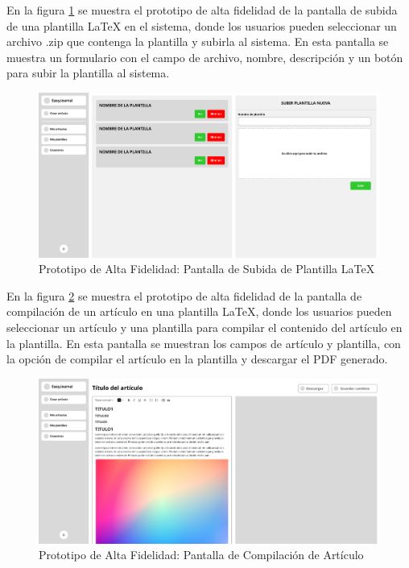 


En la figura \ref{fig:prototipo-subir-plantilla} se muestra el prototipo de alta fidelidad de la pantalla de subida de una plantilla LaTeX en el sistema, donde los usuarios pueden seleccionar un archivo .zip que contenga la plantilla y subirla al sistema. En esta pantalla se muestra un formulario con el campo de archivo, nombre, descripción y un botón para subir la plantilla al sistema.

\begin{figure}[H]
    \centering
    \includegraphics[width=1\textwidth]{IMAGENES/prototipo-subir-plantilla.png}
    \caption{Prototipo de Alta Fidelidad: Pantalla de Subida de Plantilla LaTeX}
\label{fig:prototipo-subir-plantilla}

\end{figure}

En la figura \ref{fig:prototipo-compilar-articulo} se muestra el prototipo de alta fidelidad de la pantalla de compilación de un artículo en una plantilla LaTeX, donde los usuarios pueden seleccionar un artículo y una plantilla para compilar el contenido del artículo en la plantilla. En esta pantalla se muestran los campos de artículo y plantilla, con la opción de compilar el artículo en la plantilla y descargar el PDF generado.

\begin{figure}[H]
    \centering
    \includegraphics[width=1\textwidth]{IMAGENES/prototipo-compilar-articulo.png}
    \caption{Prototipo de Alta Fidelidad: Pantalla de Compilación de Artículo}
\label{fig:prototipo-compilar-articulo}

\end{figure}

